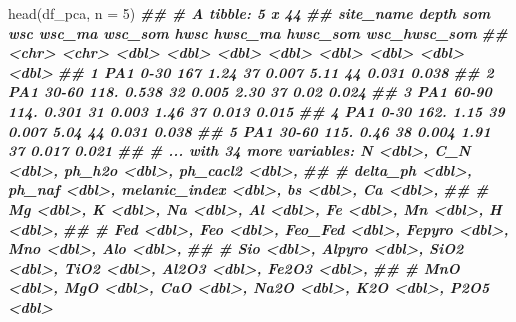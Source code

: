 \documentclass[
]{article}
\newenvironment{Shaded}{\begin{snugshade}}{\end{snugshade}}
\newcommand{\AttributeTok}[1]{\textcolor[rgb]{0.77,0.63,0.00}{#1}}
\newcommand{\DecValTok}[1]{\textcolor[rgb]{0.00,0.00,0.81}{#1}}
\newcommand{\DocumentationTok}[1]{\textcolor[rgb]{0.56,0.35,0.01}{\textbf{\textit{#1}}}}
\newcommand{\FunctionTok}[1]{\textcolor[rgb]{0.00,0.00,0.00}{#1}}
\newcommand{\NormalTok}[1]{#1}
\begin{document}
\begin{Shaded}
\begin{Highlighting}[]
\FunctionTok{head}\NormalTok{(df\_pca, }\AttributeTok{n =} \DecValTok{5}\NormalTok{)}
\DocumentationTok{\#\# \# A tibble: 5 x 44}
\DocumentationTok{\#\#   site\_name depth   som   wsc wsc\_ma wsc\_som  hwsc hwsc\_ma hwsc\_som wsc\_hwsc\_som}
\DocumentationTok{\#\#   \textless{}chr\textgreater{}     \textless{}chr\textgreater{} \textless{}dbl\textgreater{} \textless{}dbl\textgreater{}  \textless{}dbl\textgreater{}   \textless{}dbl\textgreater{} \textless{}dbl\textgreater{}   \textless{}dbl\textgreater{}    \textless{}dbl\textgreater{}        \textless{}dbl\textgreater{}}
\DocumentationTok{\#\# 1 PA1       0{-}30   167  1.24      37   0.007  5.11      44    0.031        0.038}
\DocumentationTok{\#\# 2 PA1       30{-}60  118. 0.538     32   0.005  2.30      37    0.02         0.024}
\DocumentationTok{\#\# 3 PA1       60{-}90  114. 0.301     31   0.003  1.46      37    0.013        0.015}
\DocumentationTok{\#\# 4 PA1       0{-}30   162. 1.15      39   0.007  5.04      44    0.031        0.038}
\DocumentationTok{\#\# 5 PA1       30{-}60  115. 0.46      38   0.004  1.91      37    0.017        0.021}
\DocumentationTok{\#\# \# ... with 34 more variables: N \textless{}dbl\textgreater{}, C\_N \textless{}dbl\textgreater{}, ph\_h2o \textless{}dbl\textgreater{}, ph\_cacl2 \textless{}dbl\textgreater{},}
\DocumentationTok{\#\# \#   delta\_ph \textless{}dbl\textgreater{}, ph\_naf \textless{}dbl\textgreater{}, melanic\_index \textless{}dbl\textgreater{}, bs \textless{}dbl\textgreater{}, Ca \textless{}dbl\textgreater{},}
\DocumentationTok{\#\# \#   Mg \textless{}dbl\textgreater{}, K \textless{}dbl\textgreater{}, Na  \textless{}dbl\textgreater{}, Al \textless{}dbl\textgreater{}, Fe \textless{}dbl\textgreater{}, Mn \textless{}dbl\textgreater{}, H \textless{}dbl\textgreater{},}
\DocumentationTok{\#\# \#   Fed \textless{}dbl\textgreater{}, Feo \textless{}dbl\textgreater{}, Feo\_Fed \textless{}dbl\textgreater{}, Fepyro \textless{}dbl\textgreater{}, Mno \textless{}dbl\textgreater{}, Alo \textless{}dbl\textgreater{},}
\DocumentationTok{\#\# \#   Sio \textless{}dbl\textgreater{}, Alpyro \textless{}dbl\textgreater{}, SiO2 \textless{}dbl\textgreater{}, TiO2 \textless{}dbl\textgreater{}, Al2O3 \textless{}dbl\textgreater{}, Fe2O3 \textless{}dbl\textgreater{},}
\DocumentationTok{\#\# \#   MnO \textless{}dbl\textgreater{}, MgO \textless{}dbl\textgreater{}, CaO \textless{}dbl\textgreater{}, Na2O \textless{}dbl\textgreater{}, K2O \textless{}dbl\textgreater{}, P2O5 \textless{}dbl\textgreater{}}
\end{Highlighting}
\end{Shaded}
\end{document}
